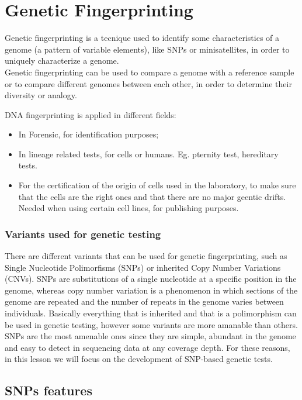 \graphicspath{{chapters/03/}}

\chapter{Genetic Fingerprinting}
Genetic fingerprinting is a tecnique used to identify some characteristics of a genome (a pattern of variable elements), like SNPs or minisatellites, in order to uniquely characterize a genome.\\
Genetic fingerprinting can be used to compare a genome with a reference sample or to compare different genomes between each other, in order to determine their diversity or analogy. 

DNA fingerprinting is applied in different fields:

\begin{itemize}
	\item In Forensic, for identification purposes;
	\item In lineage related tests, for cells or humans. Eg. pternity test, hereditary tests.
	\item For the certification of the origin of cells used in the laboratory, to make sure that the cells are the right ones and that there are no major geentic drifts. Needed when using certain cell lines, for publishing purposes.
\end{itemize}


\subsection{Variants used for genetic testing}

There are different variants that can be used for genetic fingerprinting, such as Single Nucleotide Polimorfisms (SNPs) or inherited Copy Number Variations (CNVs).
SNPs are substitutions of a single nucleotide at a specific position in the genome, whereas copy number variation is a phenomenon in which sections of the genome are repeated and the number of repeats in the genome varies between individuals.
Basically everything that is inherited and that is a polimorphism can be used in genetic testing, however some variants are more amanable than others.
SNPs are the most amenable ones since they are simple, abundant in the genome and easy to detect in sequencing data at any coverage depth. For these reasons, in this lesson we will focus on the development of SNP-based genetic tests.

\section{SNPs features}

